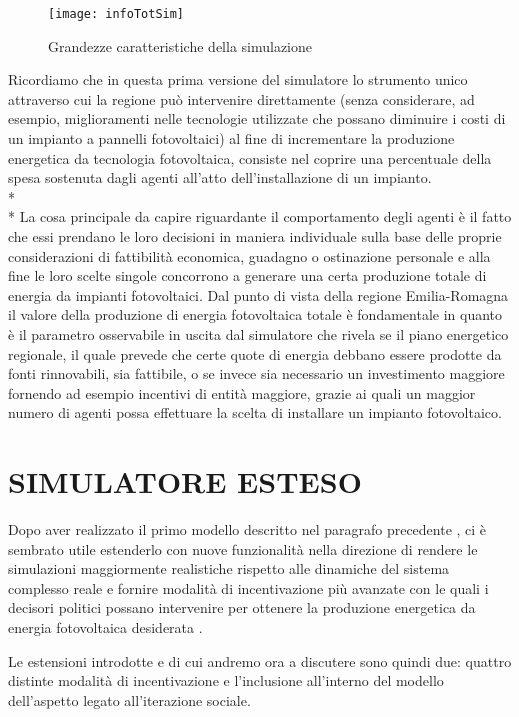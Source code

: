 \documentclass[12pt,a4paper,openright,twoside]{report}
\begin{document}
\begin{figure}[hbt]
	\centering
	\texttt{[image: infoTotSim]}
	\caption{Grandezze caratteristiche della simulazione}
	\label{infoTotSim}
\end{figure}

Ricordiamo che in questa prima versione del simulatore lo strumento unico attraverso cui la regione può intervenire direttamente (senza considerare, ad esempio, miglioramenti nelle tecnologie utilizzate che possano diminuire i costi di un impianto a pannelli fotovoltaici) al fine di incrementare la produzione energetica da tecnologia fotovoltaica, consiste nel coprire una percentuale della spesa sostenuta dagli agenti all'atto dell'installazione di un impianto.\\*\\* 
La cosa principale da capire riguardante il comportamento degli agenti è il fatto che essi prendano le loro decisioni in maniera individuale sulla base delle proprie considerazioni di fattibilità economica, guadagno o ostinazione personale e alla fine le loro scelte singole concorrono a generare una certa produzione totale di energia da impianti fotovoltaici. Dal punto di vista della regione Emilia-Romagna il valore della produzione di energia fotovoltaica totale è fondamentale in quanto è il parametro osservabile in uscita dal simulatore che rivela se il piano energetico regionale, il quale prevede che certe quote di energia debbano essere prodotte da fonti rinnovabili, sia fattibile, o se invece sia necessario un investimento maggiore fornendo ad esempio incentivi di entità maggiore, grazie ai quali un maggior numero di agenti possa effettuare la scelta di installare un impianto fotovoltaico.


\section{SIMULATORE ESTESO}

Dopo aver realizzato il primo modello descritto nel paragrafo precedente \cite{tesiCroce}, ci è sembrato utile estenderlo con nuove funzionalità nella direzione di rendere le simulazioni maggiormente realistiche rispetto alle dinamiche del sistema complesso reale e fornire modalità di incentivazione più avanzate con le quali i decisori politici possano intervenire per ottenere la produzione energetica da energia fotovoltaica desiderata \cite{lavoroCerri}.

Le estensioni introdotte e di cui andremo ora a discutere sono quindi due: quattro distinte modalità di incentivazione e l'inclusione all'interno del modello dell'aspetto legato all'iterazione sociale.
\end{document}
